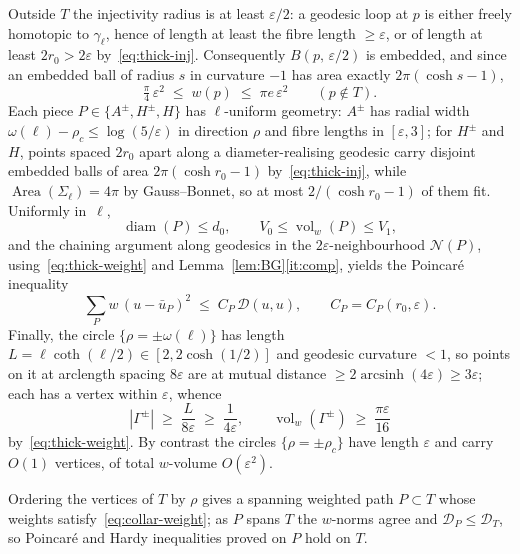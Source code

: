 \documentclass[10pt,reqno]{amsart}
\theoremstyle{remark}
\newcommand{\vol}{\operatorname{vol}}
\newcommand{\DD}{\mathcal{D}}
\newcommand{\B}[2]{B(#1,\,#2)}
\begin{document}
Outside $T$ the injectivity radius is at least $\varepsilon/2$: a
geodesic loop at $p$ is either freely homotopic to $\gamma_\ell$, hence
of length at least the fibre length $\ge\varepsilon$, or of length at
least $2r_0>2\varepsilon$ by~\eqref{eq:thick-inj}. Consequently
$\B{p}{\varepsilon/2}$ is embedded, and since an embedded ball of
radius $s$ in curvature $-1$ has area exactly $2\pi(\cosh s-1)$,
\begin{equation}
\label{eq:thick-weight}
  \tfrac{\pi}{4}\,\varepsilon^2\;\le\;w(p)\;\le\;\pi e\,\varepsilon^2
  \qquad (p\notin T).
\end{equation}
Each piece $P\in\{A^\pm,H^\pm,H\}$ has $\ell$-uniform geometry: $A^\pm$
has radial width $\omega(\ell)-\rho_c\le\log(5/\varepsilon)$ in direction $\rho$  and fibre
lengths in $[\varepsilon,3]$; for $H^\pm$ and $H$, points spaced
$2r_0$ apart along a diameter-realising geodesic carry disjoint
embedded balls of area $2\pi(\cosh r_0-1)$ by~\eqref{eq:thick-inj},
while $\operatorname{Area}(\Sigma_\ell)=4\pi$ by Gauss--Bonnet, so at
most $2/(\cosh r_0-1)$ of them fit. Uniformly in~$\ell$,
\begin{equation}
\label{eq:piece-geometry}
  \operatorname{diam}(P)\le d_0,\qquad V_0\le\vol_w(P)\le V_1 ,
\end{equation}
and the chaining argument along geodesics in the $2\varepsilon$-neighbourhood
$\mathcal N(P)$, using~\eqref{eq:thick-weight} and
Lemma~\ref{lem:BG}\ref{it:comp}, yields the Poincar\'e inequality
\begin{equation}
\label{eq:piece-poincare}
  \sum_{P}w\,(u-\bar u_P)^2\;\le\;C_P\,\DD(u,u),
  \qquad C_P=C_P(r_0,\varepsilon).
\end{equation}
Finally, the circle $\{\rho=\pm\omega(\ell)\}$ has length
$L=\ell\coth(\ell/2)\in[2,2\cosh(1/2)]$ and geodesic curvature $<1$,
so points on it
at arclength spacing $8\varepsilon$ are at mutual distance
$\ge2\operatorname{arcsinh}(4\varepsilon)\ge3\varepsilon$; each has a
vertex within $\varepsilon$, whence
\begin{equation}
\label{eq:overlap-volume}
  |\Gamma^\pm|\;\ge\;\frac{L}{8\varepsilon}\;\ge\;\frac1{4\varepsilon},
  \qquad
  \vol_w(\Gamma^\pm)\;\ge\;\frac{\pi\varepsilon}{16}
\end{equation}
by~\eqref{eq:thick-weight}.
By contrast the circles $\{\rho=\pm\rho_c\}$ have length
$\varepsilon$ and carry $O(1)$ vertices, of total $w$-volume
$O(\varepsilon^2)$.

Ordering the vertices of $T$ by $\rho$ gives a spanning weighted path
$P\subset T$ whose weights satisfy~\eqref{eq:collar-weight}; as $P$ spans $T$ the
$w$-norms agree and $\DD_P\le\DD_T$, so Poincar\'e and Hardy
inequalities proved on $P$ hold on $T$.
\end{document}
